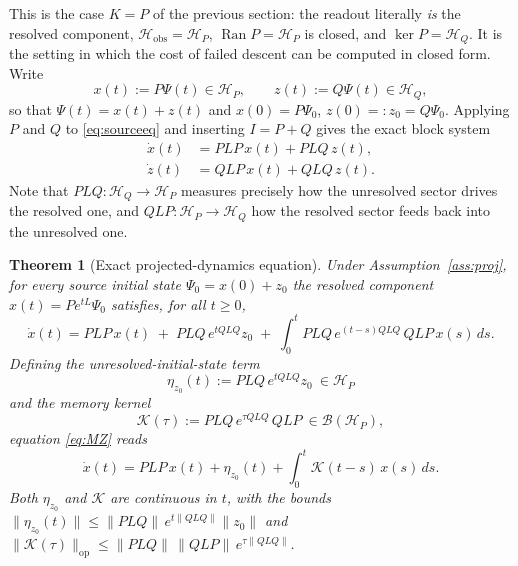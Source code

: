 \documentclass[11pt,reqno]{amsart}
\numberwithin{equation}{section}
\theoremstyle{plain}
\newtheorem{theorem}{Theorem}[section]
\theoremstyle{definition}
\theoremstyle{remark}
\newcommand{\Hobs}{\mathcal{H}_{\mathrm{obs}}}
\newcommand{\HP}{\mathcal{H}_{P}}
\newcommand{\HQ}{\mathcal{H}_{Q}}
\newcommand{\Ran}{\operatorname{Ran}}
\newcommand{\Kmem}{\mathcal{K}}
\begin{document}
This is the case $K=P$ of the previous section: the readout literally \emph{is} the resolved
component, $\Hobs=\HP$, $\Ran P=\HP$ is closed, and $\ker P=\HQ$. It is the setting in which
the cost of failed descent can be computed in closed form. Write
\begin{equation}
\label{eq:xz}
x(t):=P\Psi(t)\in\HP,
\qquad
z(t):=Q\Psi(t)\in\HQ ,
\end{equation}
so that $\Psi(t)=x(t)+z(t)$ and $x(0)=P\Psi_{0}$, $z(0)=:z_{0}=Q\Psi_{0}$. Applying $P$ and
$Q$ to \eqref{eq:sourceeq} and inserting $I=P+Q$ gives the exact block system
\begin{align}
\dot x(t)&=PLP\,x(t)+PLQ\,z(t),\label{eq:blockx}\\
\dot z(t)&=QLP\,x(t)+QLQ\,z(t).\label{eq:blockz}
\end{align}
Note that $PLQ:\HQ\to\HP$ measures precisely how the unresolved sector drives the resolved
one, and $QLP:\HP\to\HQ$ how the resolved sector feeds back into the unresolved one.

\begin{theorem}[Exact projected-dynamics equation]
\label{thm:projected}
Under Assumption~\ref{ass:proj}, for every source initial state $\Psi_{0}=x(0)+z_{0}$ the
resolved component $x(t)=Pe^{tL}\Psi_{0}$ satisfies, for all $t\ge0$,
\begin{equation}
\label{eq:MZ}
\boxed{\ \
\dot x(t)
=PLP\,x(t)
\;+\;PLQ\,e^{tQLQ}z_{0}
\;+\;\int_{0}^{t}PLQ\,e^{(t-s)QLQ}\,QLP\,x(s)\,ds .
\ \ }
\end{equation}
Defining the \emph{unresolved-initial-state term}
\begin{equation}
\label{eq:eta}
\eta_{z_{0}}(t):=PLQ\,e^{tQLQ}z_{0}\ \in\HP
\end{equation}
and the \emph{memory kernel}
\begin{equation}
\label{eq:Kmem}
\Kmem(\tau):=PLQ\,e^{\tau QLQ}\,QLP\ \in\mathcal{B}(\HP),
\end{equation}
equation \eqref{eq:MZ} reads
\begin{equation}
\label{eq:MZ2}
\dot x(t)=PLP\,x(t)+\eta_{z_{0}}(t)+\int_{0}^{t}\Kmem(t-s)\,x(s)\,ds .
\end{equation}
Both $\eta_{z_{0}}$ and $\Kmem$ are continuous in $t$, with the bounds
$\lVert\eta_{z_{0}}(t)\rVert\le\lVert PLQ\rVert\,e^{t\lVert QLQ\rVert}\lVert z_{0}\rVert$
and
$\lVert\Kmem(\tau)\rVert_{\mathrm{op}}\le\lVert PLQ\rVert\,\lVert QLP\rVert\,e^{\tau\lVert QLQ\rVert}$.
\end{theorem}
\end{document}
